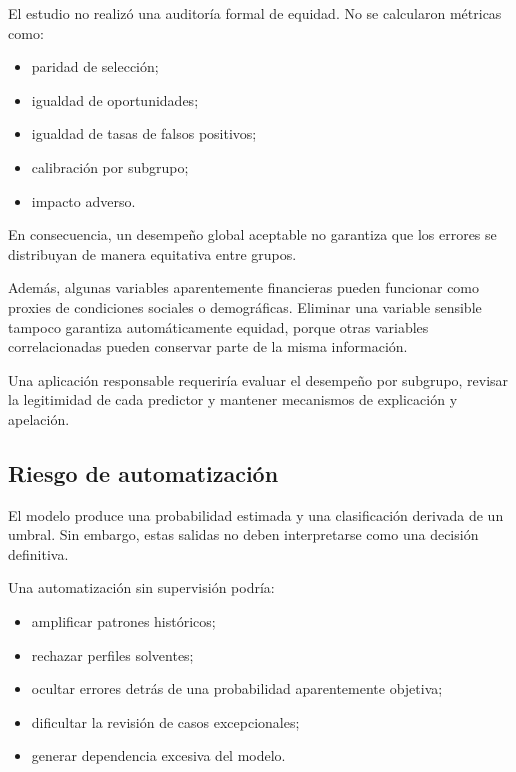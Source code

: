 El estudio no realizó una auditoría formal de equidad. No se calcularon
métricas como:

\begin{itemize}
    \item paridad de selección;

    \item igualdad de oportunidades;

    \item igualdad de tasas de falsos positivos;

    \item calibración por subgrupo;

    \item impacto adverso.
\end{itemize}

En consecuencia, un desempeño global aceptable no garantiza que los
errores se distribuyan de manera equitativa entre grupos.

Además, algunas variables aparentemente financieras pueden funcionar como
proxies de condiciones sociales o demográficas. Eliminar una variable
sensible tampoco garantiza automáticamente equidad, porque otras
variables correlacionadas pueden conservar parte de la misma información.

Una aplicación responsable requeriría evaluar el desempeño por subgrupo,
revisar la legitimidad de cada predictor y mantener mecanismos de
explicación y apelación.

\subsection{Riesgo de automatización}

El modelo produce una probabilidad estimada y una clasificación derivada
de un umbral. Sin embargo, estas salidas no deben interpretarse como una
decisión definitiva.

Una automatización sin supervisión podría:

\begin{itemize}
    \item amplificar patrones históricos;

    \item rechazar perfiles solventes;

    \item ocultar errores detrás de una probabilidad aparentemente
    objetiva;

    \item dificultar la revisión de casos excepcionales;

    \item generar dependencia excesiva del modelo.
\end{itemize}

